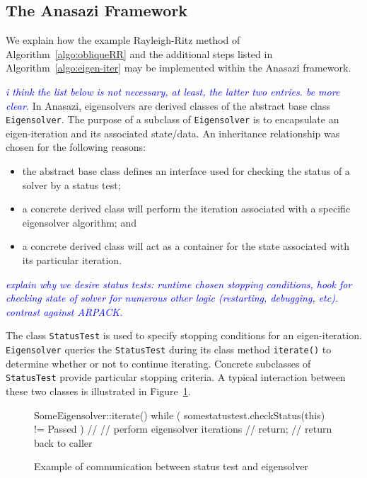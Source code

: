 \documentclass[acmtoms]{acmtrans2m}
\newcounter{algorithm}
\newcommand{\aspace}[1]{\texttt{#1}}
\newcommand{\cbcomm}[1]{\textcolor{blue}{\emph{#1}}}
\begin{document}
\subsection{The Anasazi Framework}
\label{subsec:anasazi:solver_framework}

We explain how the example Rayleigh-Ritz method of
Algorithm~\ref{algo:obliqueRR} and the additional steps listed in
Algorithm~\ref{algo:eigen-iter} may be implemented within the Anasazi
framework.

\cbcomm{i think the list below is not necessary, at least, the latter
two entries. be more clear.}
In Anasazi, eigensolvers are derived classes of the abstract base
class \aspace{Eigensolver}. The purpose of a subclass of
\aspace{Eigensolver} is to encapsulate an eigen-iteration and
its associated state/data. An inheritance relationship was chosen for
the following reasons:
\begin{itemize}
  \item the abstract base class defines an interface used for checking the
    status of a solver by a status test;
  \item a concrete derived class will perform the iteration associated
    with a specific eigensolver algorithm; and
  \item a concrete derived class will act as a container for the state
    associated with its particular iteration.
\end{itemize}

\cbcomm{explain why we desire status tests: runtime chosen stopping
conditions, hook for checking state of solver for numerous other logic
(restarting, debugging, etc). contrast against ARPACK.}

The class \aspace{StatusTest} is used to specify stopping conditions for an
eigen-iteration. \aspace{Eigensolver} queries the \aspace{StatusTest} during its class
method \aspace{iterate()} to determine whether or not to continue iterating. Concrete
subclasses of \aspace{StatusTest} provide particular stopping criteria. A typical
interaction between these two classes is illustrated in Figure~\ref{fig:comm}.

\begin{figure}[htb]
\begin{center}
\begin{boxedverbatim}
SomeEigensolver::iterate() {
  while ( somestatustest.checkStatus(this) != Passed ) {
    //
    // perform eigensolver iterations
    //
  }
  return;  // return back to caller
}
\end{boxedverbatim}
\end{center}
\caption{Example of communication between status test and eigensolver}
\label{fig:comm}
\end{figure}
\end{document}
